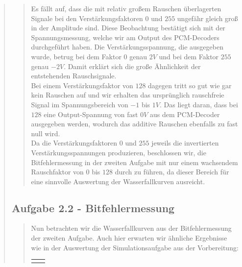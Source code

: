 \begin{quote}
\begin{quote}
        Es fällt auf, dass die mit relativ großem Rauschen überlagerten Signale
        bei den Verstärkungsfaktoren $0$ und $255$ ungefähr gleich groß in der Amplitude
        sind. Diese Beobachtung bestätigt sich mit der Spannungsmessung, welche
        wir am Output des PCM-Decoders durchgeführt haben. Die
        Verstärkungsspannung, die ausgegeben wurde, betrug bei dem Faktor $0$
        genau $2V$ und bei dem Faktor $255$ genau $-2V$. Damit erklärt sich die
        große Ähnlichkeit der entstehenden Rauschsignale.\\
        Bei einem Verstärkungsfaktor von $128$ dagegen tritt so gut wie gar kein
        Rauschen auf und wir erhalten das ursprünglich rauschfreie Signal im
        Spannungsbereich von $-1$ bis $1V$. Das liegt daran, dass bei $128$ eine
        Output-Spannung von fast $0V$ aus dem PCM-Decoder ausgegeben werden,
        wodurch das additive Rauschen ebenfalls zu fast null wird.\\
        Da die Verstärkungsfaktoren $0$ und $255$ jeweils die invertierten
        Verstärkungsspannungen produzieren, beschlossen wir, die
        Bitfehlermessung in der zweiten Aufgabe mit nur einem wachsendem
        Rauschfaktor von $0$ bis $128$ durch zu führen, da dieser Bereich für
        eine sinnvolle Auswertung der Wasserfallkurven ausreicht.
        
        
        \end{quote}  %
    
    \subsection{Aufgabe 2.2 - Bitfehlermessung}
    \begin{quote}
        
        Nun betrachten wir die Wasserfallkurven aus der Bitfehlermessung der
        zweiten Aufgabe. Auch hier erwarten wir ähnliche Ergebnisse wie in der
        Auswertung der Simulationsaufgabe aus der Vorbereitung:
        
        \begin{center}
                \begin{tabular}{ll}
    
                \hspace{-12em}
                    \begin{minipage}{0.6\textwidth}
    

\end{minipage}
\end{tabular}
\end{center}
\end{quote}
\end{quote}
